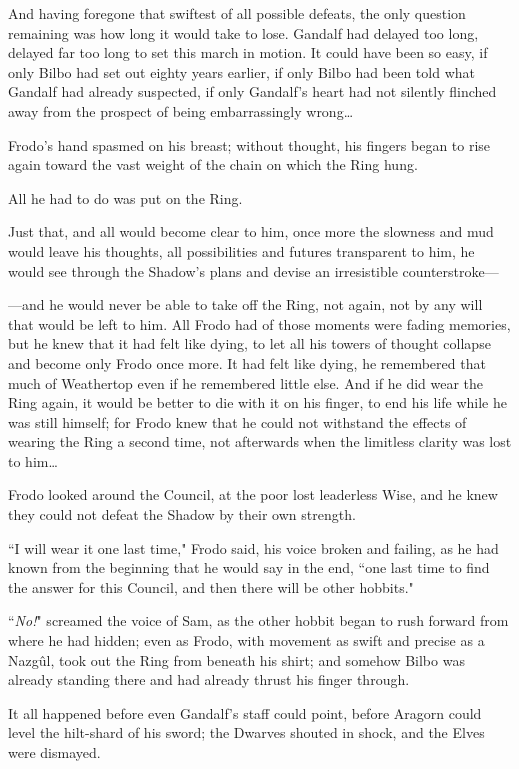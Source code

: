 And having foregone that swiftest of all possible defeats, the only question remaining was how long it would take to lose. Gandalf had delayed too long, delayed far too long to set this march in motion. It could have been so easy, if only Bilbo had set out eighty years earlier, if only Bilbo had been told what Gandalf had already suspected, if only Gandalf's heart had not silently flinched away from the prospect of being embarrassingly wrong{\ldots}

Frodo's hand spasmed on his breast; without thought, his fingers began to rise again toward the vast weight of the chain on which the Ring hung.

All he had to do was put on the Ring.

Just that, and all would become clear to him, once more the slowness and mud would leave his thoughts, all possibilities and futures transparent to him, he would see through the Shadow's plans and devise an irresistible counterstroke—

—and he would never be able to take off the Ring, not again, not by any will that would be left to him. All Frodo had of those moments were fading memories, but he knew that it had felt like dying, to let all his towers of thought collapse and become only Frodo once more. It had felt like dying, he remembered that much of Weathertop even if he remembered little else. And if he did wear the Ring again, it would be better to die with it on his finger, to end his life while he was still himself; for Frodo knew that he could not withstand the effects of wearing the Ring a second time, not afterwards when the limitless clarity was lost to him{\ldots}

Frodo looked around the Council, at the poor lost leaderless Wise, and he knew they could not defeat the Shadow by their own strength.

``I will wear it one last time," Frodo said, his voice broken and failing, as he had known from the beginning that he would say in the end, ``one last time to find the answer for this Council, and then there will be other hobbits."

``\emph{No!}" screamed the voice of Sam, as the other hobbit began to rush forward from where he had hidden; even as Frodo, with movement as swift and precise as a Nazgûl, took out the Ring from beneath his shirt; and somehow Bilbo was already standing there and had already thrust his finger through.

It all happened before even Gandalf's staff could point, before Aragorn could level the hilt-shard of his sword; the Dwarves shouted in shock, and the Elves were dismayed.


